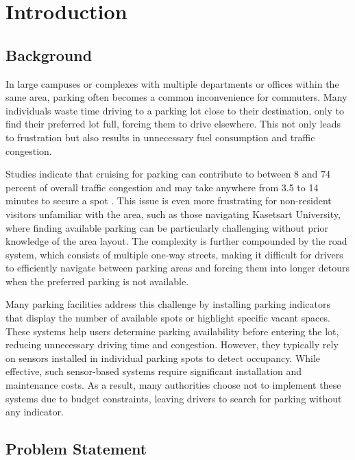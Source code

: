 \chapter{Introduction}
\label{chap:introduction}

\section{Background}
\label{section:background}

In large campuses or complexes with multiple departments or offices within the same area, parking often becomes a common inconvenience for commuters.
Many individuals waste time driving to a parking lot close to their destination, only to find their preferred lot full, forcing them to drive elsewhere.
This not only leads to frustration but also results in unnecessary fuel consumption and traffic congestion.


Studies indicate that cruising for parking can contribute to between 8 and 74 percent of overall traffic congestion and may take anywhere from 3.5 to 14 minutes to secure a spot \cite{shoup:2006}.
This issue is even more frustrating for non-resident visitors unfamiliar with the area, such as those navigating Kasetsart University, where finding available parking can be particularly challenging without prior knowledge of the area layout.
The complexity is further compounded by the road system, which consists of multiple one-way streets, making it difficult for drivers to efficiently navigate between parking areas and forcing them into longer detours when the preferred parking is not available.


Many parking facilities address this challenge by installing parking indicators that display the number of available spots or highlight specific vacant spaces.
These systems help users determine parking availability before entering the lot, reducing unnecessary driving time and congestion.
However, they typically rely on sensors installed in individual parking spots to detect occupancy.
While effective, such sensor-based systems require significant installation and maintenance costs.
As a result, many authorities choose not to implement these systems due to budget constraints, leaving drivers to search for parking without any indicator.

\section{Problem Statement}
\label{section:problem-statement}

